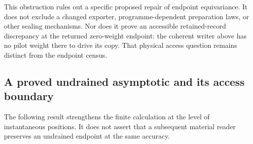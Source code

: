 \documentclass[11pt,a4paper]{article}
\theoremstyle{definition}
\theoremstyle{remark}\newtheorem{remark}[theorem]{Remark}
\begin{document}
This obstruction rules out a specific proposed repair of endpoint equivariance. It does not exclude a changed exporter, programme-dependent preparation laws, or other sealing mechanisms. Nor does it prove an accessible retained-record discrepancy at the returned zero-weight endpoint: the coherent writer above has no pilot weight there to drive its copy. That physical access question remains distinct from the endpoint census.

\subsection{A proved undrained asymptotic and its access boundary}

The following result strengthens the finite calculation at the level of instantaneous positions. It does not assert that a subsequent material reader preserves an undrained endpoint at the same accuracy.
\end{document}
